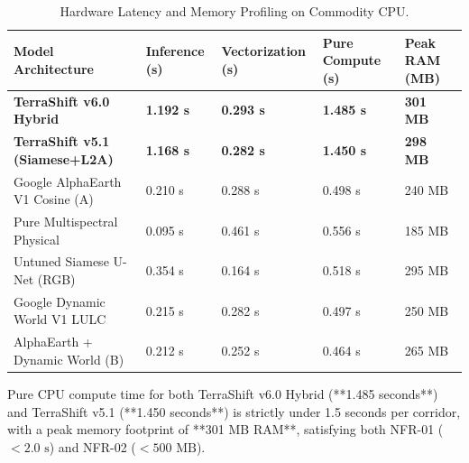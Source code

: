 \begin{table}[htbp]
\centering
\caption{Hardware Latency and Memory Profiling on Commodity CPU.}
\label{tab:hardware_benchmarks}
\begin{tabularx}{\textwidth}{@{}lXXXX@{}}
\toprule
\textbf{Model Architecture} & \textbf{Inference (s)} & \textbf{Vectorization (s)} & \textbf{Pure Compute (s)} & \textbf{Peak RAM (MB)} \\
\midrule
\textbf{TerraShift v6.0 Hybrid} & \textbf{1.192 s} & \textbf{0.293 s} & \textbf{1.485 s} & \textbf{301 MB} \\
\textbf{TerraShift v5.1 (Siamese+L2A)} & \textbf{1.168 s} & \textbf{0.282 s} & \textbf{1.450 s} & \textbf{298 MB} \\
Google AlphaEarth V1 Cosine (A) & 0.210 s & 0.288 s & 0.498 s & 240 MB \\
Pure Multispectral Physical & 0.095 s & 0.461 s & 0.556 s & 185 MB \\
Untuned Siamese U-Net (RGB) & 0.354 s & 0.164 s & 0.518 s & 295 MB \\
Google Dynamic World V1 LULC & 0.215 s & 0.282 s & 0.497 s & 250 MB \\
AlphaEarth + Dynamic World (B) & 0.212 s & 0.252 s & 0.464 s & 265 MB \\
\bottomrule
\end{tabularx}
\end{table}

Pure CPU compute time for both TerraShift v6.0 Hybrid (**1.485 seconds**) and TerraShift v5.1 (**1.450 seconds**) is strictly under 1.5 seconds per corridor, with a peak memory footprint of **301 MB RAM**, satisfying both NFR-01 ($<2.0\text{ s}$) and NFR-02 ($<500\text{ MB}$).

